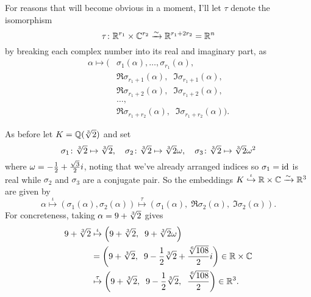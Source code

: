 For reasons that will become obvious in a moment, I'll let $\tau$ denote the isomorphism
\[
	\tau \colon \mathbb R^{r_1} \times \mathbb C^{r_2} \xrightarrow{\sim} \mathbb R^{r_1+2r_2} = \mathbb R^n
\]
by breaking each complex number into its real and imaginary part, as
\begin{align*}
\alpha \mapsto  \big(& \sigma_1(\alpha), \dots, \sigma_{r_1}(\alpha), \\
& \Re \sigma_{r_1+1}(\alpha), \;\; \Im \sigma_{r_1+1}(\alpha), \\
& \Re \sigma_{r_1+2}(\alpha), \;\; \Im \sigma_{r_1+2}(\alpha), \\
& \dots, \\
& \Re \sigma_{r_1+r_2}(\alpha), \;\; \Im \sigma_{r_1+r_2}(\alpha) \big).
\end{align*}
\begin{example}
	As before let $K = \mathbb Q(\sqrt[3]{2})$ and set
	\[ \sigma_1 \colon \sqrt[3]{2} \mapsto \sqrt[3]{2},
		\quad
		\sigma_2 \colon \sqrt[3]{2} \mapsto \sqrt[3]{2} \omega,
		\quad
		\sigma_3 \colon \sqrt[3]{2} \mapsto \sqrt[3]{2} \omega^2 \]
	where $\omega = - \frac{1}{2} + \frac{\sqrt3}{2} i$,
	noting that we've already arranged indices so $\sigma_1 = \mathrm{id}$ is real
	while $\sigma_2$ and $\sigma_3$ are a conjugate pair.
	So the embeddings $K \overset\iota{\hookrightarrow} \mathbb R \times \mathbb C \xrightarrow{\sim} \mathbb R^3$ are given by
	\[
		\alpha \overset\iota\longmapsto \left( \sigma_1(\alpha), \sigma_2(\alpha) \right)
		\overset\tau\longmapsto \left( \sigma_1(\alpha), \; \Re\sigma_2(\alpha), \; \Im\sigma_2(\alpha)  \right). \]
	For concreteness, taking $\alpha = 9 + \sqrt[3]{2}$ gives
	\begin{align*}
		9 + \sqrt[3]{2} &\overset\iota\mapsto
		\left( 9 + \sqrt[3]{2}, \;\; 9 + \sqrt[3]{2}\omega \right) \\
		&= \left( 9 + \sqrt[3]{2}, \;\;
		9 - \frac{1}{2}\sqrt[3]{2} + \frac{\sqrt[6]{108}}{2} i  \right) \in \mathbb R \times \mathbb C \\
		&\overset\tau\mapsto \left( 9 + \sqrt[3]{2}, \;\; 9 - \frac{1}{2} \sqrt[3]{2},
		\;\; \frac{\sqrt[6]{108}}{2}  \right) \in \mathbb R^3.
	\end{align*}
\end{example}

